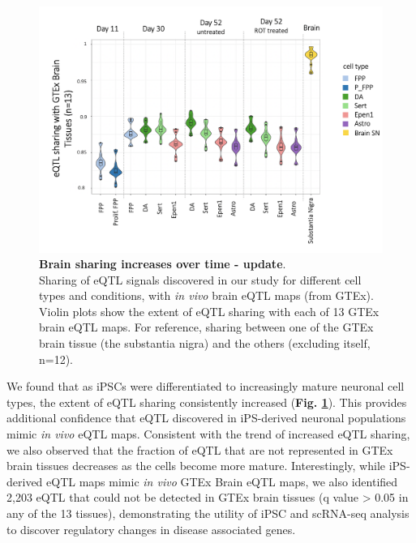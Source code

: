 \begin{figure}[h]
\centering
\includegraphics[width=16cm]{Chapter5/Fig/neuroseq_gtex_brain_boxplots.png}
\caption[Brain sharing increase]{\textbf{Brain sharing increases over time - update}.\\
Sharing of eQTL signals discovered in our study for different cell types and conditions, 
with \textit{in vivo} brain eQTL maps (from GTEx). 
Violin plots show the extent of eQTL sharing with each of 13 GTEx brain eQTL maps.
For reference, sharing between one of the GTEx brain tissue (the substantia nigra) and the others (excluding itself, n=12).}
\label{fig:neuroseq_and_gtex_brain_sharing}
\end{figure}

We found that as iPSCs were differentiated to increasingly mature neuronal cell types, the extent of eQTL sharing consistently increased (\textbf{Fig. \ref{fig:neuroseq_and_gtex_brain_sharing}}). 
This provides additional confidence that eQTL discovered in iPS-derived neuronal populations mimic \textit{in vivo} eQTL maps. 
Consistent with the trend of increased eQTL sharing, we also observed that the fraction of eQTL that are not represented in GTEx brain tissues decreases as the cells become more mature. 
Interestingly, while iPS-derived eQTL maps mimic \textit{in vivo} GTEx Brain eQTL maps, we also identified 2,203 eQTL that could not be detected in GTEx brain tissues (q value > 0.05 in any of the 13 tissues), demonstrating the utility of iPSC and scRNA-seq analysis to discover regulatory changes in disease associated genes. \\

